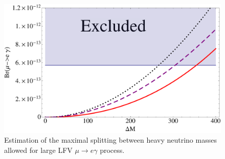 \documentclass[twocolumn,superscriptaddress,showpacs,prl,nofootinbib,floatfix]{revtex4}
\begin{document}
  \begin{figure}[h!]
  \begin{center}
  \includegraphics[scale=0.5]{Plot1}
  \caption{Estimation of the maximal splitting between heavy neutrino masses allowed for large LFV $\mu \to e \gamma$ process.   
  }
  \end{center}\label{meg1}
  \end{figure}
  


\end{document}
